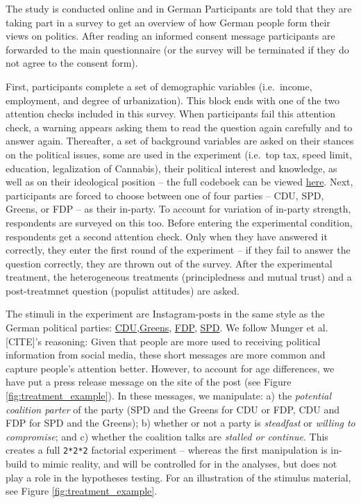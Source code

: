 \documentclass[]{article}
\begin{document}
The study is conducted online and in German Participants are told that
they are taking part in a survey to get an overview of how German people
form their views on politics. After reading an informed consent message
participants are forwarded to the main questionnaire (or the survey will
be terminated if they do not agree to the consent form).

First, participants complete a set of demographic variables
(i.e.~income, employment, and degree of urbanization). This block ends
with one of the two attention checks included in this survey. When
participants fail this attention check, a warning appears asking them to
read the question again carefully and to answer again. Thereafter, a set
of background variables are asked on their stances on the political
issues, some are used in the experiment (i.e.~top tax, speed limit,
education, legalization of Cannabis), their political interest and
knowledge, as well as on their ideological position -- the full codeboek
can be viewed \protect\hyperlink{}{here}. Next, participants are forced
to choose between one of four parties -- CDU, SPD, Greens, or FDP -- as
their in-party. To account for variation of in-party strength,
respondents are surveyed on this too. Before entering the experimental
condition, respondents get a second attention check. Only when they have
answered it correctly, they enter the first round of the experiment --
if they fail to answer the question correctly, they are thrown out of
the survey. After the experimental treatment, the heterogeneous
treatments (principledness and mutual trust) and a post-treatmnet
question (populist attitudes) are asked.

The stimuli in the experiment are Instagram-posts in the same style as
the German political parties:
\href{https://www.instagram.com/cdu}{CDU},\href{https://www.instagram.com/die_gruenen}{Greens},
\href{https://www.instagram.com/fdp}{FDP},
\href{https://www.instagram.com/spdde}{SPD}. We follow Munger et al.
{[}CITE{]}'s reasoning: Given that people are more used to receiving
political information from social media, these short messages are more
common and capture people's attention better. However, to account for
age differences, we have put a press release message on the site of the
post (see Figure \ref{fig:treatment_example}). In these messages, we
manipulate: a) the \emph{potential coalition parter} of the party (SPD
and the Greens for CDU or FDP, CDU and FDP for SPD and the Greens); b)
whether or not a party is \emph{steadfast} or \emph{willing to
compromise}; and c) whether the coalition talks are \emph{stalled or
continue}. This creates a full \texttt{2*2*2} factorial experiment --
whereas the first manipulation is in-build to mimic reality, and will be
controlled for in the analyses, but does not play a role in the
hypotheses testing. For an illustration of the stimulus material, see
Figure \ref{fig:treatment_example}.
\end{document}
